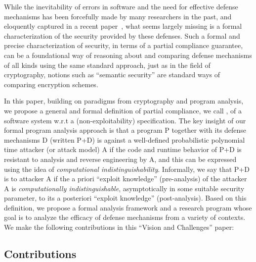 While the inevitability of errors in software and the need for
effective defense mechanisms has been forcefully made by many
researchers in the past, and eloquently captured in a recent
paper~\cite{berger}, what seems largely missing is a formal
characterization of the security provided by these defenses. Such a
formal and precise characterization of security, in terms of a partial
compliance guarantee, can be a foundational way of reasoning about and
comparing defense mechanisms of all kinds using the same standard
approach, just as in the field of cryptography, notions such as
``semantic security'' are standard ways of comparing encryption
schemes.

In this paper, building on paradigms from cryptography and program
analysis, we propose a general and formal definition of partial
compliance, we call \resistance, of a software system w.r.t a
(non-exploitability) specification. The key insight of our formal
program analysis approach is that a program P together with its
defense mechanisms D (written P+D) is \resistant against a
well-defined probabilistic polynomial time attacker (or attack model)
A if the code and runtime behavior of P+D is resistant to analysis and
reverse engineering by A, and this can be expressed using the idea of
{\it computational indistinguishability}. Informally, we say that P+D
is \resistant to attacker A if the a priori ``exploit knowledge''
(pre-analysis) of the attacker A is {\it computationally
  indistinguishable}, asymptotically in some suitable security
parameter, to its a posteriori ``exploit knowledge''
(post-analysis). Based on this definition, we propose a formal
analysis framework and a research program whose goal is to analyze the
efficacy of defense mechanisms from a variety of contexts. We make the
following contributions in this ``Vision and Challenges'' paper:

\subsection*{Contributions}

